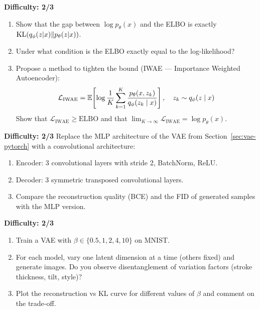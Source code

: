 \begin{exercise}
\label{exo:elbo-tightness}
\textbf{Difficulty: 2/3}
\begin{enumerate}
    \item Show that the gap between $\log p_\theta(x)$ and the ELBO is exactly $\mathrm{KL}(q_\phi(z|x) \| p_\theta(z|x))$.
    \item Under what condition is the ELBO exactly equal to the log-likelihood?
    \item Propose a method to tighten the bound (IWAE --- Importance Weighted Autoencoder):
    \begin{equation}
    \mathcal{L}_{\text{IWAE}} = \mathbb{E}\!\left[\log \frac{1}{K}\sum_{k=1}^{K} \frac{p_\theta(x, z_k)}{q_\phi(z_k \mid x)}\right], \quad z_k \sim q_\phi(z \mid x)
    \end{equation}
    Show that $\mathcal{L}_{\text{IWAE}} \geq \text{ELBO}$ and that $\lim_{K \to \infty} \mathcal{L}_{\text{IWAE}} = \log p_\theta(x)$.
\end{enumerate}
\end{exercise}

\begin{exercise}
\label{exo:conv-vae}
\textbf{Difficulty: 2/3}
Replace the MLP architecture of the VAE from Section~\ref{sec:vae-pytorch} with a convolutional architecture:
\begin{enumerate}
    \item Encoder: 3 convolutional layers with stride 2, BatchNorm, ReLU.
    \item Decoder: 3 symmetric transposed convolutional layers.
    \item Compare the reconstruction quality (BCE) and the FID of generated samples with the MLP version.
\end{enumerate}
\end{exercise}

\begin{exercise}
\label{exo:beta-vae-exp}
\textbf{Difficulty: 2/3}
\begin{enumerate}
    \item Train a VAE with $\beta \in \{0.5, 1, 2, 4, 10\}$ on MNIST.
    \item For each model, vary one latent dimension at a time (others fixed) and generate images. Do you observe disentanglement of variation factors (stroke thickness, tilt, style)?
    \item Plot the reconstruction vs KL curve for different values of $\beta$ and comment on the trade-off.
\end{enumerate}
\end{exercise}

